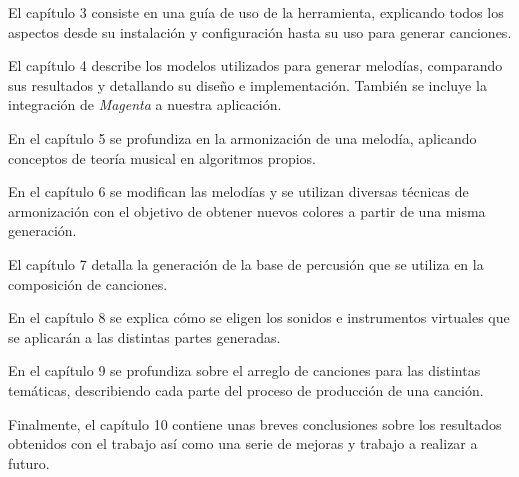 El capítulo 3 consiste en una guía de uso de la herramienta, explicando todos los aspectos desde su instalación y configuración hasta su uso para generar canciones.

El capítulo 4 describe los modelos utilizados para generar melodías, comparando sus resultados y detallando su diseño e implementación. También se incluye la integración de \textit{Magenta} a nuestra aplicación.

En el capítulo 5 se profundiza en la armonización de una melodía, aplicando conceptos de teoría musical en algoritmos propios.

En el capítulo 6 se modifican las melodías y se utilizan diversas técnicas de armonización con el objetivo de obtener nuevos colores a partir de una misma generación.

El capítulo 7 detalla la generación de la base de percusión que se utiliza en la composición de canciones.

En el capítulo 8 se explica cómo se eligen los sonidos e instrumentos virtuales que se aplicarán a las distintas partes generadas.

En el capítulo 9 se profundiza sobre el arreglo de canciones para las distintas temáticas, describiendo cada parte del proceso de producción de una canción.

Finalmente, el capítulo 10 contiene unas breves conclusiones sobre los resultados obtenidos con el trabajo así como una serie de mejoras y trabajo a realizar a futuro.

\lipsum[0]